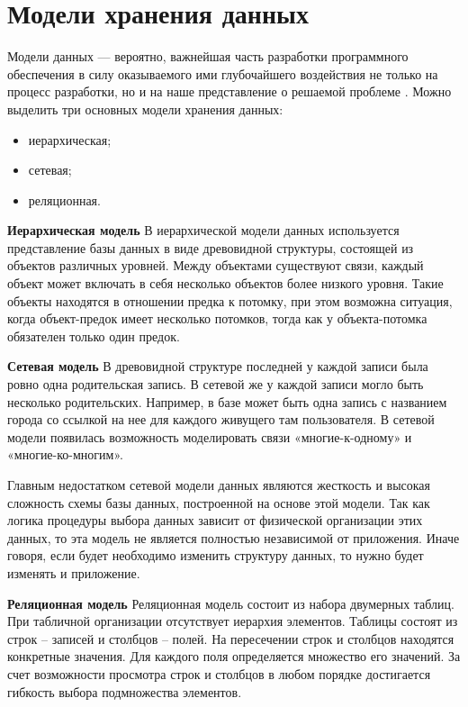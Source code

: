 \section{Модели хранения данных}

Модели данных — вероятно, важнейшая часть разработки программного обеспечения в силу оказываемого ими глубочайшего воздействия не только на процесс
разработки, но и на наше представление о решаемой проблеме \cite{kleppman}.
Можно выделить три основных модели хранения данных:
\begin{itemize}
	\item иерархическая;
	\item сетевая;
	\item реляционная.
\end{itemize}

\textbf{Иерархическая модель}
В иерархической модели данных используется представление базы данных в виде древовидной структуры, состоящей из объектов различных уровней. Между объектами существуют связи, каждый объект может включать в себя несколько объектов более низкого уровня. Такие объекты находятся в отношении предка к потомку, при этом возможна ситуация, когда объект-предок имеет несколько потомков, тогда как у объекта-потомка обязателен только один предок.

\textbf{Сетевая модель}
В древовидной структуре последней у каждой записи была ровно одна родительская запись. В сетевой же у каждой записи могло быть несколько родительских. Например, в базе
может быть одна запись с названием города со ссылкой на нее
для каждого живущего там пользователя. В сетевой модели появилась возможность моделировать связи «многие-к-одному» и «многие-ко-многим».

Главным недостатком сетевой модели данных являются жесткость и высокая сложность схемы базы данных, построенной на основе этой модели. Так как логика процедуры выбора данных зависит от физической организации этих данных, то эта модель не является полностью независимой от приложения. Иначе говоря, если будет необходимо изменить структуру данных, то нужно будет изменять и приложение.

\textbf{Реляционная модель}
Реляционная модель состоит из набора двумерных таблиц. При табличной организации отсутствует иерархия элементов. Таблицы состоят из строк – записей и столбцов – полей. На пересечении строк и столбцов находятся конкретные значения. Для каждого поля определяется множество его значений. За счет возможности просмотра строк и столбцов в любом порядке достигается гибкость выбора подмножества элементов.

